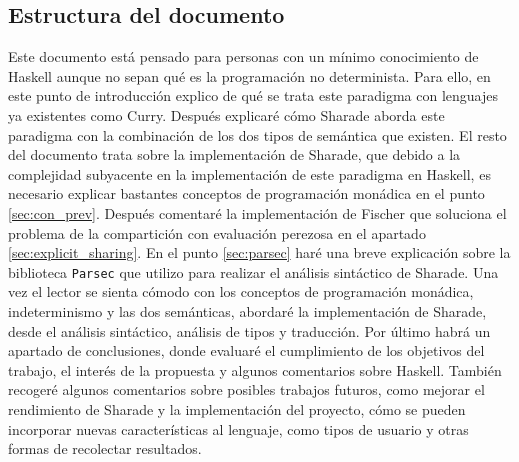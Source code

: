 \documentclass[class=article, crop=false]{standalone}
\begin{document}
\subsection{Estructura del documento}
Este documento está pensado para personas con un mínimo conocimiento de Haskell aunque no
sepan qué es la programación no determinista. Para ello, en este punto de introducción
explico de qué se trata este paradigma con lenguajes ya existentes como Curry. Después
explicaré cómo Sharade aborda este paradigma con la combinación de los dos tipos de semántica
que existen. El resto del documento trata sobre la implementación de Sharade, que debido a la
complejidad subyacente en la implementación de este paradigma en Haskell, es necesario
explicar bastantes conceptos de programación monádica en el punto \ref{sec:con_prev}. Después
comentaré la implementación de Fischer que soluciona el problema de la compartición con
evaluación perezosa en el apartado \ref{sec:explicit_sharing}.
En el punto \ref{sec:parsec} haré una breve explicación sobre la biblioteca \verb`Parsec` que
utilizo para realizar el análisis sintáctico de Sharade. Una vez el lector se sienta cómodo
con los conceptos de programación monádica, indeterminismo y las dos semánticas, abordaré la
implementación de Sharade, desde el análisis sintáctico, análisis de tipos y traducción. Por
último habrá un apartado de conclusiones, donde evaluaré el cumplimiento de los objetivos del
trabajo, el interés de la propuesta y algunos comentarios sobre Haskell. También recogeré
algunos comentarios sobre posibles trabajos futuros, como mejorar el rendimiento de Sharade
y la implementación del proyecto, cómo se pueden incorporar nuevas características al
lenguaje, como tipos de usuario y otras formas de recolectar resultados.
\end{document}
